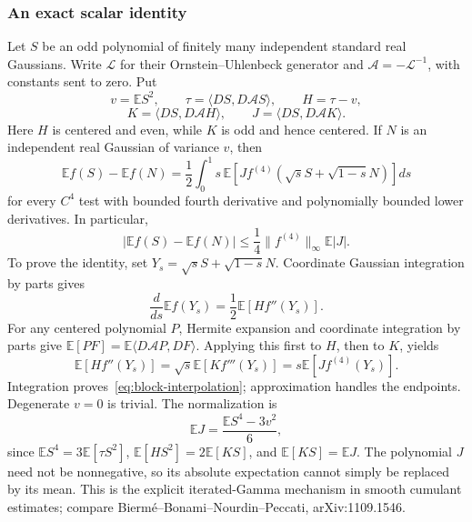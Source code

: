 \subsubsection{An exact scalar identity}
Let $S$ be an odd polynomial of finitely many independent standard real
Gaussians. Write $\mathcal L$ for their Ornstein--Uhlenbeck generator and
$\mathcal A=-\mathcal L^{-1}$, with constants sent to zero. Put
\[
 v=\mathbb E S^2,\qquad
 \tau=\langle DS,D\mathcal AS\rangle,\qquad H=\tau-v,
\]
\[
 K=\langle DS,D\mathcal AH\rangle,\qquad
 J=\langle DS,D\mathcal AK\rangle.
\]
Here $H$ is centered and even, while $K$ is odd and hence centered.
If $N$ is an independent real Gaussian of variance $v$, then
\begin{equation}\label{eq:block-interpolation}
 \mathbb Ef(S)-\mathbb Ef(N)
 =\frac12\int_0^1 s\,
  \mathbb E\left[Jf^{(4)}(\sqrt{s}S+\sqrt{1-s}N)\right]ds
\end{equation}
for every $C^4$ test with bounded fourth derivative and polynomially
bounded lower derivatives. In particular,
\[
 |\mathbb Ef(S)-\mathbb Ef(N)|
 \le\frac14\|f^{(4)}\|_\infty\mathbb E|J|.
\]
To prove the identity, set $Y_s=\sqrt{s}S+\sqrt{1-s}N$.
Coordinate Gaussian integration by parts gives
\[
 \frac d{ds}\mathbb Ef(Y_s)=\frac12\mathbb E[Hf''(Y_s)].
\]
For any centered polynomial $P$, Hermite expansion and coordinate
integration by parts give
$\mathbb E[PF]=\mathbb E\langle D\mathcal AP,DF\rangle$.
Applying this first to $H$, then to $K$, yields
\[
 \mathbb E[Hf''(Y_s)]=\sqrt{s}\mathbb E[Kf'''(Y_s)]
                   =s\mathbb E[Jf^{(4)}(Y_s)].
\]
Integration proves~\eqref{eq:block-interpolation}; approximation handles
the endpoints. Degenerate $v=0$ is trivial. The normalization is
\[
 \mathbb EJ=\frac{\mathbb ES^4-3v^2}{6},
\]
since $\mathbb ES^4=3\mathbb E[\tau S^2]$,
$\mathbb E[HS^2]=2\mathbb E[KS]$, and $\mathbb E[KS]=\mathbb EJ$.
The polynomial $J$ need not be nonnegative, so its absolute expectation
cannot simply be replaced by its mean. This is the explicit
iterated-Gamma mechanism in smooth cumulant estimates; compare
Bierm\'e--Bonami--Nourdin--Peccati, arXiv:1109.1546.

